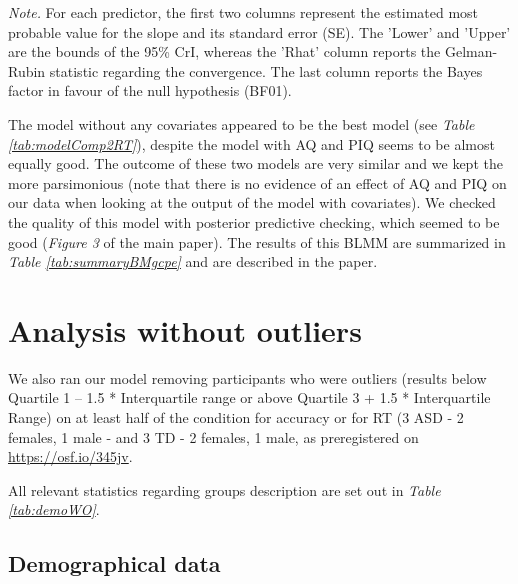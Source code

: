\documentclass[
  11pt,
  english,
  ,doc,floatsintext]{apa6}
\begin{document}
\begin{table}[htb]
\begin{center}
\begin{threeparttable}
{}

\begin{tablenotes}[para]
\normalsize{\textit{Note.} For each predictor, the first two columns represent the estimated
    most probable value for the slope and its standard error (SE). The 'Lower' and 'Upper' are the bounds of the 95\% CrI, whereas the 'Rhat' column reports the Gelman-Rubin statistic regarding the convergence. The last column reports the Bayes factor in favour of the null hypothesis (BF01).}
\end{tablenotes}

\end{threeparttable}
\end{center}

\end{table}

The model without any covariates appeared to be the best model (see \emph{Table \ref{tab:modelComp2RT}}), despite the model with AQ and PIQ seems to be almost equally good. The outcome of these two models are very similar and we kept the more parsimonious (note that there is no evidence of an effect of AQ and PIQ on our data when looking at the output of the model with covariates).
We checked the quality of this model with posterior predictive checking, which seemed to be good (\emph{Figure 3} of the main paper). The results of this BLMM are summarized in \emph{Table \ref{tab:summaryBMgcpe}} and are described in the paper.

\newpage

\hypertarget{analysis-without-outliers}{%
\section{Analysis without outliers}\label{analysis-without-outliers}}

We also ran our model removing participants who were outliers (results below Quartile 1 -- 1.5 * Interquartile range or above Quartile 3 + 1.5 * Interquartile Range) on at least half of the condition for accuracy or for RT (3 ASD - 2 females, 1 male - and 3 TD - 2 females, 1 male, as preregistered on \url{https://osf.io/345jv}.

All relevant statistics regarding groups description are set out in \emph{Table \ref{tab:demoWO}}.

\hypertarget{demographical-data}{%
\subsection{Demographical data}\label{demographical-data}}
\end{document}
